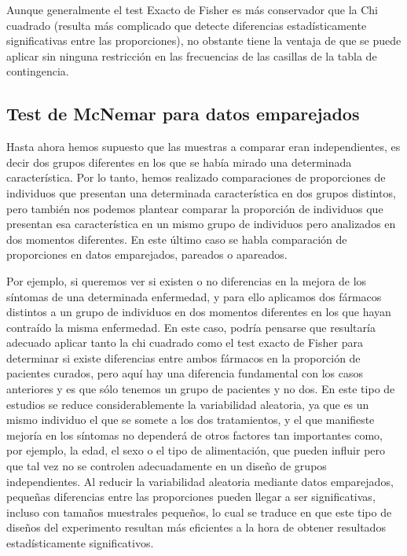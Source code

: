 Aunque generalmente el test Exacto de Fisher es más conservador que la Chi cuadrado (resulta más complicado que detecte diferencias
estadísticamente significativas entre las proporciones), no obstante tiene la ventaja de que se puede aplicar sin ninguna restricción en las
frecuencias de las casillas de la tabla de contingencia.


\subsection{Test de McNemar para datos emparejados}

Hasta ahora hemos supuesto que las muestras a comparar eran independientes, es decir dos grupos diferentes en los que se había mirado una
determinada característica. Por lo tanto, hemos realizado comparaciones de proporciones de individuos que presentan una determinada
característica en dos grupos distintos, pero también nos podemos plantear comparar la proporción de individuos que presentan esa
característica en un mismo grupo de individuos pero analizados en dos momentos diferentes. En este último caso se habla comparación de
proporciones en datos emparejados, pareados o apareados.

Por ejemplo, si queremos ver si existen o no diferencias en la mejora de los síntomas de una determinada enfermedad, y para ello aplicamos
dos fármacos distintos a un grupo de individuos en dos momentos diferentes en los que hayan contraído la misma enfermedad. En este caso,
podría pensarse que resultaría adecuado aplicar tanto la chi cuadrado como el test exacto de Fisher para determinar si existe diferencias
entre ambos fármacos en la proporción de pacientes curados, pero aquí hay una diferencia fundamental con los casos anteriores y es que sólo
tenemos un grupo de pacientes y no dos. En este tipo de estudios se reduce considerablemente la variabilidad aleatoria, ya que es un mismo
individuo el que se somete a los dos tratamientos, y el que manifieste mejoría en los síntomas no dependerá de otros factores tan
importantes como, por ejemplo, la edad, el sexo o el tipo de alimentación, que pueden influir pero que tal vez no se controlen adecuadamente
en un diseño de grupos independientes. Al reducir la variabilidad aleatoria mediante datos emparejados, pequeñas diferencias entre las
proporciones pueden llegar a ser significativas, incluso con tamaños muestrales pequeños, lo cual se traduce en que este tipo de diseños del
experimento resultan más eficientes a la hora de obtener resultados estadísticamente significativos.

